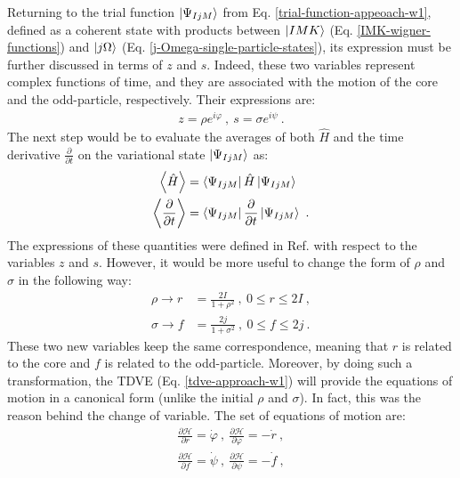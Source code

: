 Returning to the trial function $\ket{\Psi_{IjM}}$ from Eq. \ref{trial-function-appeoach-w1}, defined as a coherent state with products between  $\ket{IMK}$ (Eq. \ref{IMK-wigner-functions}) and $\ket{j\Omega}$ (Eq. \ref{j-Omega-single-particle-states}), its expression must be further discussed in terms of $z$ and $s$. Indeed, these two variables represent complex functions of time, and they are associated with the motion of the core and the odd-particle, respectively. Their expressions are:
\begin{align}
    z=\rho e^{i\varphi}\ ,\ s=\sigma e^{i\psi}\ .
    \label{z-s-variables}
\end{align}
The next step would be to evaluate the averages of both $\hat{H}$ and the time derivative $\frac{\partial}{\partial t}$ on the variational state $\ket{\Psi_{IjM}}$ as:
\begin{align}
    \left\langle \hat{H} \right\rangle&=\bra{\Psi_{IjM}}\hat{H}\ket{\Psi_{IjM}}\nonumber\\
    \left\langle \frac{\partial}{\partial t} \right\rangle&=\bra{\Psi_{IjM}}\frac{\partial}{\partial t}\ket{\Psi_{IjM}}\ .
    \label{hamiltonian-average}
\end{align}
The expressions of these quantities were defined in Ref. \cite{raduta2017semiclassical} with respect to the variables $z$ and $s$. However, it would be more useful to change the form of $\rho$ and $\sigma$ in the following way:
\begin{align}
    \rho \to r&=\frac{2I}{1+\rho^2}\ ,\ 0\leq r\leq 2I\ ,\nonumber\\
    \sigma \to f&=\frac{2j}{1+\sigma^2}\ ,\ 0\leq f\leq 2j\ .
    \label{changed-rho-sigma-variables}
\end{align}
These two new variables keep the same correspondence, meaning that $r$ is related to the core and $f$ is related to the odd-particle. Moreover, by doing such a transformation, the TDVE (Eq. \ref{tdve-approach-w1}) will provide the equations of motion in a canonical form (unlike the initial $\rho$ and $\sigma$). In fact, this was the reason behind the change of variable. The set of equations of motion are:
\begin{align}
    \frac{\partial \mathcal{H}}{\partial r}=\dot{\varphi}\ ,\ \frac{\partial \mathcal{H}}{\partial \varphi}=-\dot{r}\ ,\nonumber\\
    \frac{\partial \mathcal{H}}{\partial f}=\dot{\psi}\ ,\ \frac{\partial \mathcal{H}}{\partial \psi}=-\dot{f}\ ,
    \label{eq-of-motion-approach-w1}
\end{align}

